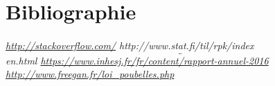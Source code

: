 \documentclass[a4paper,12pt]{report} %
\begin{document}
\newpage %
\part{Bibliographie}
\label{pt:5}

% 

%
\paragraph{\url{http://stackoverflow.com/}\newline
http://www.stat.fi/til/rpk/index$$\_$$en.html\newline
\url{https://www.inhesj.fr/fr/content/rapport-annuel-2016}\newline
\url{http://www.freegan.fr/loi_poubelles.php}\newline}
\end{document}
